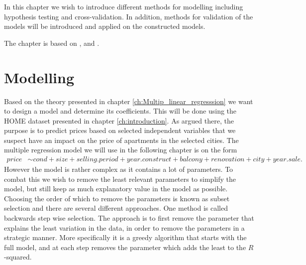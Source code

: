 In this chapter we wish to introduce different methods for modelling including hypothesis testing and cross-validation.
In addition, methods for validation of the models will be introduced and applied on the constructed models.

The chapter is based on \cite{Allison2012}, \cite{MadsenThyregod2011} and \cite{Wooldridge2012}.

\section{Modelling} \label{sec:modelling}
Based on the theory presented in chapter \ref{ch:Multip_linear_regresssion} we want to design a model and determine its coefficients. 
This will be done using the HOME dataset presented in chapter \ref{ch:introduction}. 
As argued there, the purpose is to predict prices based on selected independent variables that we suspect have an impact on the price of apartments in the selected cities.
The multiple regression model we will use in the following chapter is on the form
\begin{align*}
    \textit{price} &\sim \textit{cond} + \textit{size} + \textit{selling.period} + \textit{year.construct} + \textit{balcony} + \textit{renovation} + \textit{city} + \textit{year.sale}.
\end{align*}
However the model is rather complex as it contains a lot of parameters.
To combat this we wish to remove the least relevant parameters to simplify the model, but still keep as much explanatory value in the model as possible.
Choosing the order of which to remove the parameters is known as subset selection and there are several different approaches.
One method is called backwards step wise selection. 
The approach is to first remove the parameter that explains the least variation in the data, in order to remove the parameters in a strategic manner.
More specifically it is a greedy algorithm that starts with the full model, and at each step removes the parameter which adds the least to the $R$-squared.
